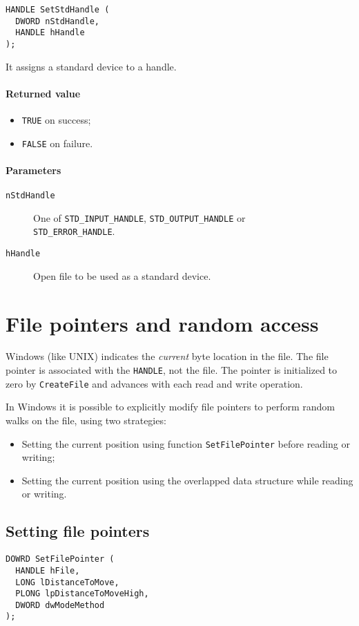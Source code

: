 \begin{verbatim}
HANDLE SetStdHandle (
  DWORD nStdHandle,
  HANDLE hHandle
);
\end{verbatim}

It assigns a standard device to a handle.

\paragraph{Returned value}
\begin{itemize}
\item \texttt{TRUE} on success;
\item \texttt{FALSE} on failure.
\end{itemize}

\paragraph{Parameters}
\begin{description}
\item [\texttt{nStdHandle}] One of \texttt{STD\_INPUT\_HANDLE}, \texttt{STD\_OUTPUT\_HANDLE} or \\ \texttt{STD\_ERROR\_HANDLE}.
\item [\texttt{hHandle}] Open file to be used as a standard device.
\end{description}

\section{File pointers and random access}
Windows (like UNIX) indicates the \emph{current} byte location in the file. The file pointer is associated with the \texttt{HANDLE}, not the file. The pointer is initialized to zero by \texttt{CreateFile} and advances with each read and write operation.

In Windows it is possible to explicitly modify file pointers to perform random walks on the file, using two strategies:
\begin{itemize}
\item Setting the current position using function \texttt{SetFilePointer} before reading or writing;
\item Setting the current position using the overlapped data structure while reading or writing.
\end{itemize}

\subsection{Setting file pointers}
\begin{verbatim}
DOWRD SetFilePointer (
  HANDLE hFile,
  LONG lDistanceToMove,
  PLONG lpDistanceToMoveHigh,
  DWORD dwModeMethod
);
\end{verbatim}

